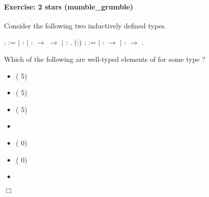 \documentclass[12pt]{report}
\begin{document}
\paragraph{Exercise: 2 stars (mumble\_grumble)}

 Consider the following two inductively defined types. \begin{coqdoccode}
\coqdocemptyline
\coqdocnoindent
{}  :  :=\coqdoceol
\coqdocindent{1.00em}
\ensuremath{|}  : \coqdoceol
\coqdocindent{1.00em}
\ensuremath{|}  :  \ensuremath{\rightarrow}  \ensuremath{\rightarrow} \coqdoceol
\coqdocindent{1.00em}
\ensuremath{|}  : .\coqdoceol
\coqdocnoindent
{}  (:) :  :=\coqdoceol
\coqdocindent{1.00em}
\ensuremath{|}  :  \ensuremath{\rightarrow}  \coqdoceol
\coqdocindent{1.00em}
\ensuremath{|}  :  \ensuremath{\rightarrow}  .\coqdoceol
\coqdocemptyline
\end{coqdoccode}
Which of the following are well-typed elements of   for
    some type ?



\begin{itemize}
\item  {} (  5)

\item  {}  (  5)

\item  {}  (  5)

\item  {}  

\item  {}  (  0)

\item  {}  (  0)

\item  {} 

\end{itemize}
 \ensuremath{\Box} 
\end{document}
